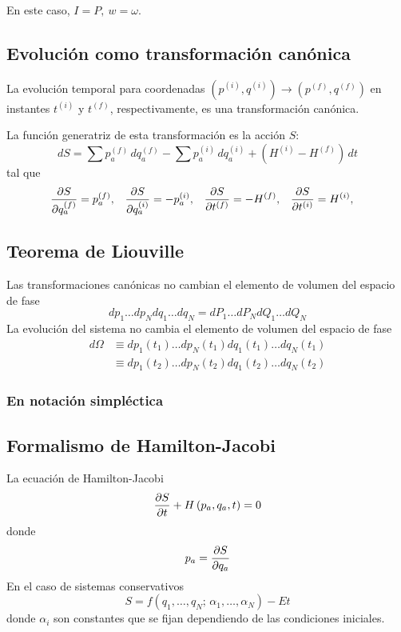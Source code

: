 \documentclass[]{article}
\numberwithin{equation}{section}
\begin{document}
En este caso, $I = P, ~ w = \omega$.

\subsection{Evolución como transformación canónica}
La evolución temporal para coordenadas $(p^{(i)},q^{(i)}) \to (p^{(f)},q^{(f)})$ en instantes $t^{(i)}$ y $t^{(f)}$, respectivamente, es una transformación canónica.

La función generatriz de esta transformación es la acción $S$:
\begin{equation}
	dS = \sum p_a^{(f)} \, dq_a^{(f)} - \sum p_a^{(i)} \, dq_a^{(i)} + \left(H^{(i)} - H^{(f)}\right) \, dt
\end{equation}
tal que
\begin{align}
	\dfrac{\partial S}{\partial q_a^{(f)}} &= p_a^{(f)}, & \dfrac{\partial S}{\partial q_a^{(i)}} &= -p_a^{(i)}, & \dfrac{\partial S}{\partial t^{(f)}} &= - H^{(f)}, & \dfrac{\partial S}{\partial t^{(i)}} &= H^{(i)}, & 
\end{align}

\subsection{Teorema de Liouville}
Las transformaciones canónicas no cambian el elemento de volumen del espacio de fase
\begin{equation}
	dp_1 \ldots dp_N dq_1 \ldots dq_N = dP_1 \ldots dP_N dQ_1 \ldots dQ_N
\end{equation}
La evolución del sistema no cambia el elemento de volumen del espacio de fase 
\begin{align}
	d\Omega &\equiv dp_1(t_1) \ldots dp_N(t_1) dq_1(t_1) \ldots dq_N(t_1) \nonumber\\
	&\equiv dp_1(t_2) \ldots dp_N(t_2) dq_1(t_2) \ldots dq_N(t_2)
\end{align}

\subsubsection{En notación simpléctica}

\subsection{Formalismo de Hamilton-Jacobi}
La ecuación de Hamilton-Jacobi
\begin{equation}
	\dfrac{\partial S}{\partial t} + H\left(p_a, q_a, t\right) = 0
\end{equation}
donde
\begin{equation}
	p_a = \dfrac{\partial S}{\partial q_a}
\end{equation}
En el caso de sistemas conservativos
\begin{equation}
	S = f(q_1,\ldots,q_N;\,\alpha_1,\ldots,\alpha_N) - Et
\end{equation}
donde $\alpha_i$ son constantes que se fijan dependiendo de las condiciones iniciales.
\end{document}
